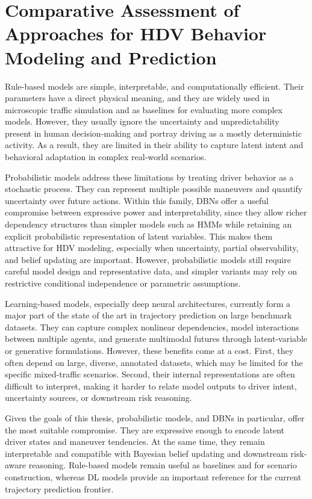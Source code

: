 \section{Comparative Assessment of Approaches for HDV Behavior Modeling and Prediction}
Rule-based models are simple, interpretable, and computationally efficient. Their parameters have a direct
physical meaning, and they are widely used in microscopic traffic simulation and as baselines for evaluating
more complex models. However, they usually ignore the uncertainty and unpredictability present in human decision-making 
and portray driving as a mostly deterministic activity. As a result, they are limited in their
ability to capture latent intent and behavioral adaptation in complex real-world scenarios.

\par Probabilistic models address these limitations by treating driver behavior as a stochastic process.
They can represent multiple possible maneuvers and quantify uncertainty over future actions. Within
this family, \acp{DBN} offer a useful compromise between expressive power and interpretability, since they allow
richer dependency structures than simpler models such as \acp{HMM} while retaining an explicit probabilistic
representation of latent variables. This makes them attractive for \ac{HDV} modeling, especially when uncertainty, 
partial observability, and belief updating are important. However, probabilistic models still require careful model 
design and representative data, and simpler variants may rely on restrictive conditional independence or parametric assumptions.

\par Learning-based models, especially deep neural architectures, currently form a major part of the state of the art
in trajectory prediction on large benchmark datasets. They can capture complex nonlinear dependencies,
model interactions between multiple agents, and generate multimodal futures through latent-variable or generative
formulations. However, these benefits come at a cost.
First, they often depend on large, diverse, annotated datasets, which may be limited for the specific mixed-traffic
scenarios. Second, their internal representations are
often difficult to interpret, making it harder to relate model outputs to driver intent, uncertainty sources, or downstream risk reasoning.

\par Given the goals of this thesis, probabilistic models, and \acp{DBN} in particular, offer the most suitable
compromise. They are expressive enough to encode latent driver states and maneuver tendencies. 
At the same time, they remain interpretable and compatible with Bayesian belief updating and downstream risk-aware reasoning.
Rule-based models remain useful as baselines and for scenario construction, whereas \ac{DL} 
models provide an important reference for the current trajectory prediction frontier.